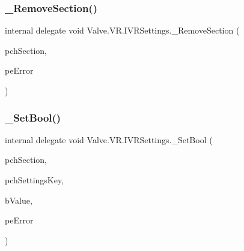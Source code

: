 \mbox{\label{struct_valve_1_1_v_r_1_1_i_v_r_settings_a1bff5a9ce11b6a9f192cc9d9d34fbcfc}} 
\subsubsection{\texorpdfstring{\_RemoveSection()}{\_RemoveSection()}}
{\footnotesize\ttfamily internal delegate void Valve.\+V\+R.\+I\+V\+R\+Settings.\+\_\+\+Remove\+Section (\begin{DoxyParamCaption}\item[{string}]{pch\+Section,  }\item[{ref \mbox{\hyperlink{namespace_valve_1_1_v_r_aeab7722b211afc3885ed77faa931291f}{E\+V\+R\+Settings\+Error}}}]{pe\+Error }\end{DoxyParamCaption})}

\mbox{\label{struct_valve_1_1_v_r_1_1_i_v_r_settings_a9d815c8edfd5d547eddfa9ae2c165714}} 
\subsubsection{\texorpdfstring{\_SetBool()}{\_SetBool()}}
{\footnotesize\ttfamily internal delegate void Valve.\+V\+R.\+I\+V\+R\+Settings.\+\_\+\+Set\+Bool (\begin{DoxyParamCaption}\item[{string}]{pch\+Section,  }\item[{string}]{pch\+Settings\+Key,  }\item[{bool}]{b\+Value,  }\item[{ref \mbox{\hyperlink{namespace_valve_1_1_v_r_aeab7722b211afc3885ed77faa931291f}{E\+V\+R\+Settings\+Error}}}]{pe\+Error }\end{DoxyParamCaption})}

\mbox{\label{struct_valve_1_1_v_r_1_1_i_v_r_settings_ad61118d96d4ec60b78250dcb93fae065}} 
